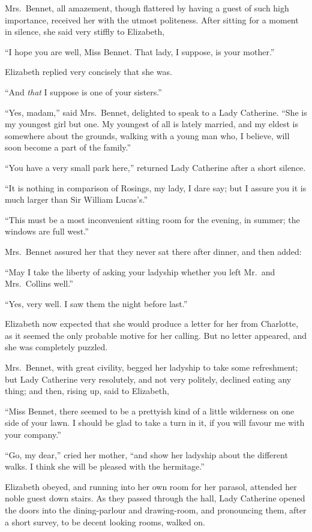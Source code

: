 \documentclass[12pt,english]{book}
\begin{document}
Mrs.\ Bennet, all amazement, though flattered by having a guest of
such high importance, received her with the utmost politeness. After
sitting for a moment in silence, she said very stiffly to Elizabeth,

{}``I hope you are well, Miss Bennet. That lady, I suppose, is your
mother.''

Elizabeth replied very concisely that she was.

{}``And \textit{that} I suppose is one of your sisters.''

{}``Yes, madam,'' said Mrs.\ Bennet, delighted to speak to a Lady
Catherine. {}``She is my youngest girl but one. My youngest of all
is lately married, and my eldest is somewhere about the grounds, walking
with a young man who, I believe, will soon become a part of the family.''

{}``You have a very small park here,'' returned Lady Catherine after
a short silence.

{}``It is nothing in comparison of Rosings, my lady, I dare say;
but I assure you it is much larger than Sir William Lucas's.''

{}``This must be a most inconvenient sitting room for the evening,
in summer; the windows are full west.''

Mrs.\ Bennet assured her that they never sat there after dinner,
and then added:

{}``May I take the liberty of asking your ladyship whether you left
Mr.\ and Mrs.\ Collins well.''

{}``Yes, very well. I saw them the night before last.''

Elizabeth now expected that she would produce a letter for her from
Charlotte, as it seemed the only probable motive for her calling.
But no letter appeared, and she was completely puzzled.

Mrs.\ Bennet, with great civility, begged her ladyship to take some
refreshment; but Lady Catherine very resolutely, and not very politely,
declined eating any thing; and then, rising up, said to Elizabeth,

{}``Miss Bennet, there seemed to be a prettyish kind of a little
wilderness on one side of your lawn. I should be glad to take a turn
in it, if you will favour me with your company.''

{}``Go, my dear,'' cried her mother, {}``and show her ladyship
about the different walks. I think she will be pleased with the hermitage.''

Elizabeth obeyed, and running into her own room for her parasol, attended
her noble guest down stairs. As they passed through the hall, Lady
Catherine opened the doors into the dining-parlour and drawing-room,
and pronouncing them, after a short survey, to be decent looking rooms,
walked on.
\end{document}
